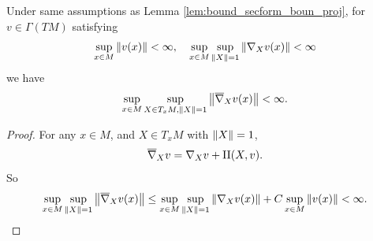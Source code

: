 \begin{cor}\label{cor:bound_ext_deriv_vec}
    Under same assumptions as Lemma \ref{lem:bound_secform_boun_proj}, for $v \in \Gamma(TM)$ satisfying
    \begin{equation*}
        \sup_{x \in M} \left\lVert v(x)\right\lVert <\infty,\quad \sup_{x \in M} \sup_{\left\lVert X\right\lVert = 1} \left\lVert\nabla_X v(x)\right\lVert < \infty
    \end{equation*}
    we have
    \begin{equation*}
        \sup_{x \in M} \sup_{X \in T_xM,\left\lVert X\right\lVert = 1} \left\lVert\overline{\nabla}_Xv(x)\right\lVert < \infty.
    \end{equation*}
\end{cor}
\begin{proof}
    For any $x \in M$, and $X \in T_xM$ with $\left\lVert X\right\lVert = 1$,
    \begin{equation*}
        \overline{\nabla}_Xv = \nabla_Xv + \mathrm{II}(X,v).
    \end{equation*}
    So
    \begin{equation*}
        \sup_{x \in M} \sup_{\left\lVert X\right\lVert = 1} \left\lVert\overline{\nabla}_Xv(x)\right\lVert \leq \sup_{x \in M} \sup_{\left\lVert X\right\lVert = 1} \left\lVert\nabla_X v(x)\right\lVert + C\sup_{x \in M} \left\lVert v(x)\right\lVert < \infty. \qedhere
    \end{equation*}
\end{proof}


